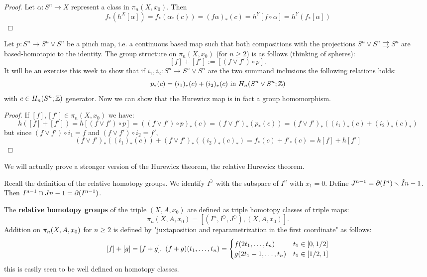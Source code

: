\begin{proof}
Let $\alpha:S^n\to X$ represent a class in $\pi_n(X,x_0)$. Then
\[f_*(h^X[\alpha])=f_*(\alpha_*(c))=(f\alpha)_*(c)=h^Y[f\circ\alpha]=h^Y(f_*[\alpha])\]
\end{proof}

 Let $p:S^n\to S^n\vee S^n$ be a pinch map, i.e. a continuous based map such that both compositions with the projections $S^n\vee S^n\rightrightarrows S^n$ are based-homotopic to the identity. The group structure on $\pi_n(X,x_0)$ (for $n\geq2$) is as follows (thinking of spheres):
\[[f]+[f']:=[(f\vee f')\circ p].\]
It will be an exercise this week to show that if $i_1,i_2:S^n\to S^n\vee S^n$ are the two summand inclusions the following relations holds:
\[p_*(c)=(i_1)_*(c)+(i_2)_*(c) \text{ in } H_n(S^n\vee S^n;{\mathbb Z})\]
with $c\in H_n(S^n;{\mathbb Z})$ generator.
Now we can show that the Hurewicz map is in fact a group homomorphism.
\begin{proof}
If $[f],[f']\in\pi_n(X,x_0)$ we have:
\[h([f]+[f'])=h[(f\vee f')\circ p]=((f\vee f')\circ p)_*(c)=(f\vee f')_*(p_*(c))=(f\vee f')_*((i_1)_*(c)+(i_2)_*(c)_*)\]
but since $(f\vee f')\circ i_1=f$ and $(f\vee f')\circ i_2=f'$,
\[(f\vee f')_*((i_1)_*(c))+(f\vee f')_*((i_2)_*(c)_*)=f_*(c)+f'_*(c)=h[f]+h[f']\]
\end{proof}

We will actually prove a stronger version of the Hurewicz theorem, the relative Hurewicz theorem.

Recall the definition of the relative homotopy groups. We identify $I^\ni$ with the subspace of $I^n$ with $x_1=0$. Define $J^{n-1}=\partial (I^n)\smallsetminus\mathring{I}{n-1}$. Then $I^{n-1}\cap J{n-1}=\partial(I^{n-1})$. 

The \textbf{relative homotopy groups} of the triple $(X,A,x_0)$ are defined as triple homotopy classes of triple maps:
\[\pi_n(X,A,x_0)=[(I^n, I^\ni, J^\ni),(X,A,x_0)].\]
Addition on $\pi_n(X,A,x_0)$ for $n\geq 2$ is defined by "juxtaposition and reparametrization in the first coordinate" as follows:
\[[f]+[g]=[f+g],\ (f+g)(\nn{t}{n})=\begin{cases}f(2t_1,\dots,t_n) & t_1\in[0,1/2] \\ g(2t_1-1,\dots,t_n) & t_1\in[1/2,1]\end{cases}\]
this is easily seen to be well defined on homotopy classes.


